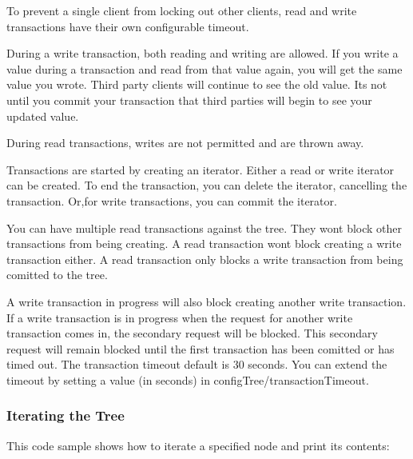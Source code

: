 To prevent a single client from locking out other clients, read and write transactions have their own configurable timeout.

During a write transaction, both reading and writing are allowed. If you write a value during a transaction and read from that value again, you will get the same value you wrote. Third party clients will continue to see the old value. It\textquotesingle{}s not until you commit your transaction that third parties will begin to see your updated value.

During read transactions, writes are not permitted and are thrown away.

Transactions are started by creating an iterator. Either a read or write iterator can be created. To end the transaction, you can delete the iterator, cancelling the transaction. Or,for write transactions, you can commit the iterator.

You can have multiple read transactions against the tree. They won\textquotesingle{}t block other transactions from being creating. A read transaction won\textquotesingle{}t block creating a write transaction either. A read transaction only blocks a write transaction from being comitted to the tree.

A write transaction in progress will also block creating another write transaction. If a write transaction is in progress when the request for another write transaction comes in, the secondary request will be blocked. This secondary request will remain blocked until the first transaction has been comitted or has timed out. The transaction timeout default is 30 seconds. You can extend the timeout by setting a value (in seconds) in {\ttfamily config\+Tree/transaction\+Timeout}.\hypertarget{c_config_cfg_iteration}{}\subsubsection{Iterating the Tree}\label{c_config_cfg_iteration}
This code sample shows how to iterate a specified node and print its contents\+:


